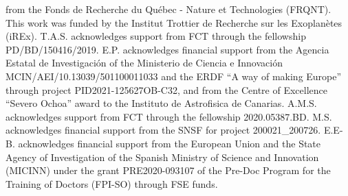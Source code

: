 \documentclass{aa}
\begin{document}
\begin{acknowledgements}
from the Fonds de Recherche du Qu\'ebec - Nature et Technologies (FRQNT). This work was funded by the Institut Trottier de Recherche sur les Exoplan\`etes (iREx). T.A.S. acknowledges support from FCT through the fellowship PD/BD/150416/2019. E.P. acknowledges financial support from the Agencia Estatal de Investigaci\'on of the Ministerio de Ciencia e Innovaci\'on MCIN/AEI/10.13039/501100011033 and the ERDF “A way of making Europe” through project PID2021-125627OB-C32, and from the Centre of Excellence “Severo Ochoa” award to the Instituto de Astrofisica de Canarias. A.M.S. acknowledges support from FCT through the fellowship 2020.05387.BD. M.S. acknowledges financial support from the SNSF for project 200021\_200726.  E.E-B. acknowledges financial support from the European Union and the State Agency of Investigation of the Spanish Ministry of Science and Innovation (MICINN) under the grant PRE2020-093107 of the Pre-Doc Program for the Training of Doctors (FPI-SO) through FSE funds.
\end{acknowledgements}

\end{document}
